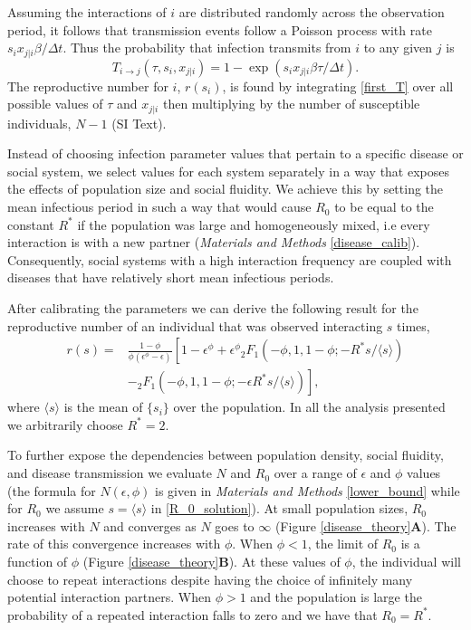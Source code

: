 \documentclass[twocolumn,8pt]{article}
\begin{document}
Assuming the interactions of $i$ are distributed randomly across the observation period, it follows that transmission events follow a Poisson process with rate $s_{i}x_{j|i}\beta/\Delta t$. Thus the probability that infection transmits from $i$ to any given $j$ is
\begin{equation}
\label{first_T}
T_{i\rightarrow j}(\tau,s_{i},x_{j|i})=1-\exp(s_{i}x_{j|i}\beta\tau/\Delta t).
\end{equation}
The reproductive number for $i$, $r(s_{i})$, is found by integrating \eqref{first_T} over all possible values of $\tau$ and $x_{j|i}$ then multiplying by the number of susceptible individuals, $N-1$ (SI Text). 

Instead of choosing infection parameter values that pertain to a specific disease or social system, we select values for each system separately in a way that exposes the effects of population size and social fluidity. We achieve this by setting the mean infectious period in such a way that would cause $R_{0}$ to be equal to the constant $R^{*}$ if the population was large and homogeneously mixed, i.e every interaction is with a new partner (\emph{Materials and Methods} \ref{disease_calib}). Consequently, social systems with a high interaction frequency are coupled with diseases that have relatively short mean infectious periods. 

After calibrating the parameters we can derive the following result for the reproductive number of an individual that was observed interacting $s$ times,
\begin{align}
\label{R_0_solution}
r(s)=&\frac{1-\phi}{\phi(\epsilon^{\phi}-\epsilon)}\left[1-\epsilon^{\phi}+\epsilon^{\phi}{}_{2}F_{1}(-\phi,1,1-\phi;-R^{*}s/\langle s \rangle)\right.\nonumber\\
&\left.-{}_{2}F_{1}(-\phi,1,1-\phi;-\epsilon R^{*}s/\langle s \rangle)\right],
\end{align}
where $\langle s \rangle$ is the mean of $\{s_{i}\}$ over the population. In all the analysis presented we arbitrarily choose $R^{*}=2$. 

To further expose the dependencies between population density, social fluidity, and disease transmission we evaluate $N$ and $R_{0}$ over a range of $\epsilon$ and $\phi$ values (the formula for $N(\epsilon,\phi)$ is given in \emph{Materials and Methods} \ref{lower_bound} while for $R_{0}$ we assume $s=\langle s \rangle$ in \eqref{R_0_solution}). At small population sizes, $R_{0}$ increases with $N$ and converges as $N$ goes to $\infty$ (Figure \ref{disease_theory}\textbf{A}). The rate of this convergence increases with $\phi$. When $\phi<1$, the limit of $R_{0}$ is a function of $\phi$ (Figure \ref{disease_theory}\textbf{B}). At these values of $\phi$, the individual will choose to repeat interactions despite having the choice of infinitely many potential interaction partners. When $\phi>1$ and the population is large the probability of a repeated interaction falls to zero and we have that $R_{0}=R^{*}$.
\end{document}

